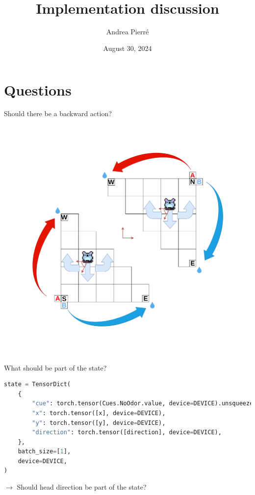 \documentclass[bigger]{beamer}
\author{Andrea Pierré}
\date{August 30, 2024}
\title{Implementation discussion}
\institute{Brown University}
\begin{document}
\maketitle
\section{Questions}
\label{sec:org4e2530a}
\begin{frame}[label={sec:orgf051d1b}]{Should there be a backward action?}
\begin{center}
\includegraphics[height=0.8\textheight]{img/RL_env-cartesian-polar.drawio.pdf}
\end{center}
\end{frame}
\begin{frame}[label={sec:orgf3f09f1},fragile]{What should be part of the state?}
\scriptsize
\begin{lstlisting}[language={Python}]
state = TensorDict(
    {
        "cue": torch.tensor(Cues.NoOdor.value, device=DEVICE).unsqueeze(-1),
        "x": torch.tensor([x], device=DEVICE),
        "y": torch.tensor([y], device=DEVICE),
        "direction": torch.tensor([direction], device=DEVICE),
    },
    batch_size=[1],
    device=DEVICE,
)
\end{lstlisting}
\normalsize
\(\to\) Should head direction be part of the state?
\end{frame}
\end{document}
